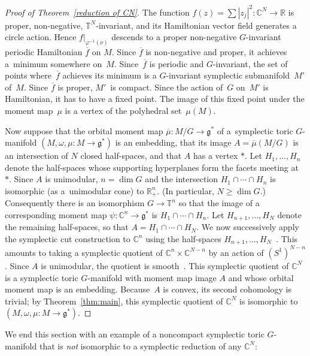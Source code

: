 \documentclass[pdftex]{sigma}
\numberwithin{equation}{section}
\begin{document}
\begin{proof}[Proof of Theorem~\ref{reduction of CN}]
The function $f(z) = \sum |z_j|^2 \colon {\mathbb C}^N\to {\mathbb R}$ is proper, non-negative,
${\mathbb T}^N$-invariant, and its Hamiltonian vector f\/ield generates a circle action.
Hence $f|_{\varphi^{-1} (\nu)}$ descends to
a proper non-negative $G$-invariant periodic Hamiltonian $\overline{f}$ on
$M$.  Since $\overline{f}$ is non-negative and proper, it achieves a~minimum somewhere on~$M$.  Since~$\overline{f}$ is periodic and
$G$-invariant, the set of points where~$\overline{f}$ achieves its minimum
is a $G$-invariant symplectic submanifold~$M'$ of~$M$.  Since $\overline{f}$
is proper, $M'$~is compact.  Since the action of~$G$ on~$M'$ is
Hamiltonian, it has to have a f\/ixed point.  The image of this f\/ixed
point under the moment map~$\mu$ is a vertex of the polyhedral set~$\mu(M)$.


Now suppose that the orbital moment map $\overline{\mu} \colon M/G \to {\mathfrak g}^*$ of a~symplectic toric $G$-manifold $(M,\omega,\mu \colon M\to {\mathfrak g}^*)$ is an
embedding, that its image $A =\overline{\mu}(M/G)$ is an intersection of
$N$ closed half-spaces, and that $A$ has a vertex $*$.
Let $H_1, \ldots, H_n$ denote the half-spaces
whose supporting hyperplanes form the facets meeting at~$*$.
Since $A$ is unimodular, $n=\dim G$
and the intersection $H_1\cap \cdots \cap H_n$ is isomorphic (as a~unimodular cone) to ${\mathbb R}^n_+$.  (In particular, $N \geq \dim G$.)
Consequently there is an isomorphism
$G\to {\mathbb T}^n$ so that the image of a corresponding moment map $\psi \colon {\mathbb C}^n
\to {\mathfrak g}^*$ is $H_1\cap \cdots \cap H_n$. Let $H_{n+1},\ldots, H_N$ denote
the remaining half-spaces, so that $A= H_1\cap\cdots\cap H_N$.  We now
successively apply the symplectic cut construction to ${\mathbb C}^n$ using the
half-spaces $H_{n+1},\ldots, H_N$~\cite{Lcuts}.  This amounts to
taking a symplectic quotient of ${\mathbb C}^n\times {\mathbb C}^{N-n}$ by an action of
$(S^1)^{N-n}$.  Since $A$ is unimodular, the quotient is smooth~\cite{LMTW}.  This symplectic quotient of ${\mathbb C}^N$ is
a symplectic toric $G$-manifold with moment map image $A$
and whose orbital moment map is an embedding.
Because~$A$ is convex, its second cohomology is trivial;
by Theorem~\ref{thm:main}, this symplectic quotient
of ${\mathbb C}^N$ is isomorphic to $(M,\omega,\mu \colon M \to {\mathfrak g}^*)$.
\end{proof}

We end this section with an example of a noncompact symplectic
toric $G$-manifold that is \emph{not} isomorphic to a symplectic
reduction of any ${\mathbb C}^N$:
\end{document}
